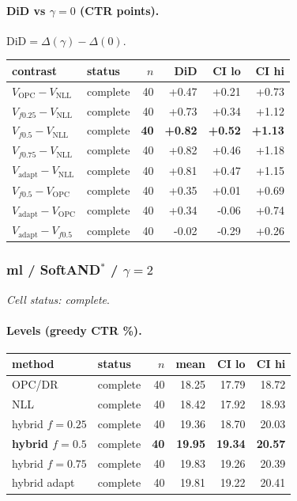 \documentclass[10pt,a4paper]{article}
\begin{document}
\paragraph{DiD vs $\gamma=0$ (CTR points).} $\mathrm{DiD}=\Delta(\gamma)-\Delta(0)$.
{\centering\small\begin{tabular}{llrrrr}
\toprule contrast & status & $n$ & DiD & CI lo & CI hi \\
\midrule
$V_{\mathrm{OPC}}-V_{\mathrm{NLL}}$ & complete & 40 & +0.47 & +0.21 & +0.73 \\
$V_{f0.25}-V_{\mathrm{NLL}}$ & complete & 40 & +0.73 & +0.34 & +1.12 \\
\textbf{$V_{f0.5}-V_{\mathrm{NLL}}$} & complete & \textbf{40} & \textbf{+0.82} & \textbf{+0.52} & \textbf{+1.13} \\
$V_{f0.75}-V_{\mathrm{NLL}}$ & complete & 40 & +0.82 & +0.46 & +1.18 \\
$V_{\mathrm{adapt}}-V_{\mathrm{NLL}}$ & complete & 40 & +0.81 & +0.47 & +1.15 \\
$V_{f0.5}-V_{\mathrm{OPC}}$ & complete & 40 & +0.35 & +0.01 & +0.69 \\
$V_{\mathrm{adapt}}-V_{\mathrm{OPC}}$ & complete & 40 & +0.34 & -0.06 & +0.74 \\
$V_{\mathrm{adapt}}-V_{f0.5}$ & complete & 40 & -0.02 & -0.29 & +0.26 \\
\bottomrule\end{tabular}\par}
\bigskip
\subsubsection{ml / SoftAND$^*$ / $\gamma=2$}
\emph{Cell status: complete}.
\paragraph{Levels (greedy CTR \%).}
{\centering\small\begin{tabular}{llrrrr}
\toprule method & status & $n$ & mean & CI lo & CI hi \\
\midrule
OPC/DR & complete & 40 & 18.25 & 17.79 & 18.72 \\
NLL & complete & 40 & 18.42 & 17.92 & 18.93 \\
hybrid $f{=}0.25$ & complete & 40 & 19.36 & 18.70 & 20.03 \\
\textbf{hybrid $f{=}0.5$} & complete & \textbf{40} & \textbf{19.95} & \textbf{19.34} & \textbf{20.57} \\
hybrid $f{=}0.75$ & complete & 40 & 19.83 & 19.26 & 20.39 \\
hybrid adapt & complete & 40 & 19.81 & 19.22 & 20.41 \\
\bottomrule\end{tabular}\par}
\end{document}
